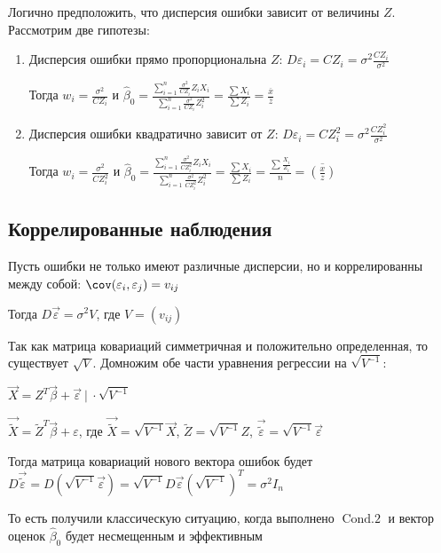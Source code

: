 \documentclass[12pt]{article}
\begin{document}
Логично предположить, что дисперсия ошибки зависит от величины $Z$. Рассмотрим две гипотезы:

\begin{enumerate}
    \item Дисперсия ошибки прямо пропорциональна $Z$: $D\varepsilon_i = C Z_i = \sigma^2 \frac{C Z_i}{\sigma^2}$

    Тогда $w_i = \frac{\sigma^2}{C Z_i}$ и $\hat \beta_0 = \frac{\sum_{i = 1}^n \frac{\sigma^2}{C Z_i} Z_i X_i}{\sum_{i = 1}^n \frac{\sigma^2}{C Z_i} Z_i^2} = \frac{\sum X_i}{\sum Z_i} = \frac{\overline{x}}{\overline{z}}$

    \item Дисперсия ошибки квадратично зависит от $Z$: $D\varepsilon_i = C Z_i^2 = \sigma^2 \frac{C Z_i^2}{\sigma^2}$

    Тогда $w_i = \frac{\sigma^2}{C Z_i^2}$ и $\hat \beta_0 = \frac{\sum_{i = 1}^n \frac{\sigma^2}{C Z_i^2} Z_i X_i}{\sum_{i = 1}^n \frac{\sigma^2}{C Z_i^2} Z_i^2} = \frac{\sum X_i}{\sum Z_i} = \frac{\sum \frac{X_i}{Z_i}}{n} = \overline{\left(\frac{x}{z}\right)}$
\end{enumerate}

\subsection{Коррелированные наблюдения}

Пусть ошибки не только имеют различные дисперсии, но и коррелированны между собой: $\cov (\varepsilon_i, \varepsilon_j) = v_{ij}$

Тогда $D \vec \varepsilon = \sigma^2 V$, где $V = \left(v_{ij}\right)$

Так как матрица ковариаций симметричная и положительно определенная, то существует $\sqrt{V}$. Домножим обе части уравнения регрессии на $\sqrt{V^{-1}}$:

$\vec X = Z^T \vec{\beta} + \vec \varepsilon \ \Big| \ \cdot \sqrt{V^{-1}}$

$\vec \tilde{X} = \tilde Z^T \vec \beta + \varepsilon$, где $\vec \tilde{X} = \sqrt{V^{-1}} \vec X$, $\tilde Z = \sqrt{V^{-1}} Z$, $\vec \tilde{\varepsilon} = \sqrt{V^{-1}} \vec \varepsilon$

Тогда матрица ковариаций нового вектора ошибок будет $D \vec \tilde{\varepsilon} = D(\sqrt{V^{-1}} \vec \varepsilon) = \sqrt{V^{-1}} D \vec \varepsilon \left(\sqrt{V^{-1}}\right)^T = \sigma^2 I_n$

То есть получили классическую ситуацию, когда выполнено $\operatorname{Cond. 2}$ и вектор оценок $\hat \beta_0$ будет несмещенным и эффективным
\end{document}
